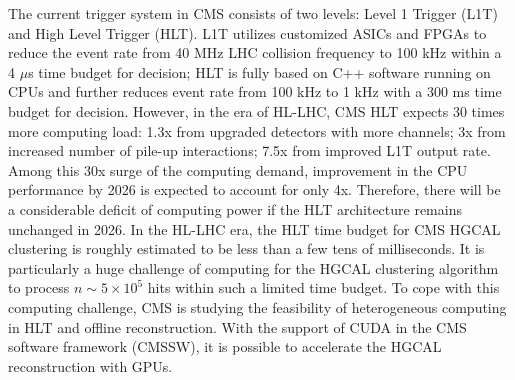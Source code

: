 The current trigger system in CMS consists of two levels: Level 1 Trigger (L1T) and High Level Trigger (HLT). L1T utilizes customized ASICs and FPGAs to reduce the event rate from 40 MHz LHC collision frequency to 100 kHz within a 4 $\mu$s time budget for decision; HLT is fully based on C++ software running on CPUs and further reduces event rate from 100 kHz to 1 kHz with a 300 ms time budget for decision. However, in the era of HL-LHC, CMS HLT expects 30 times more computing load: 1.3x from upgraded detectors with more channels; 3x from increased number of pile-up interactions; 7.5x from improved L1T output rate. Among this 30x surge of the computing demand, improvement in the CPU performance by 2026 is expected to account for only 4x. Therefore, there will be a considerable deficit of computing power if the HLT architecture remains unchanged in 2026. In the HL-LHC era, the HLT time budget for CMS HGCAL clustering is roughly estimated to be less than a few tens of milliseconds. It is particularly a huge challenge of computing for the HGCAL clustering algorithm to process $n\sim5\times10^5$ hits within such a limited time budget. To cope with this computing challenge, CMS is studying the feasibility of heterogeneous computing in HLT and offline reconstruction. With the support of CUDA \cite{nvidia2011nvidia} in the CMS software framework (CMSSW), it is possible to accelerate the HGCAL reconstruction with GPUs. 
